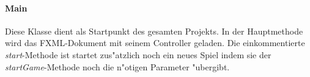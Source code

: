 \paragraph{Main}
\label{par:main}
Diese Klasse dient als Startpunkt des gesamten Projekts. In der Hauptmethode wird das FXML-Dokument mit seinem Controller geladen. Die einkommentierte \emph{start}-Methode ist startet zus"atzlich noch ein neues Spiel indem sie der \emph{startGame}-Methode noch die n"otigen Parameter "ubergibt. 
